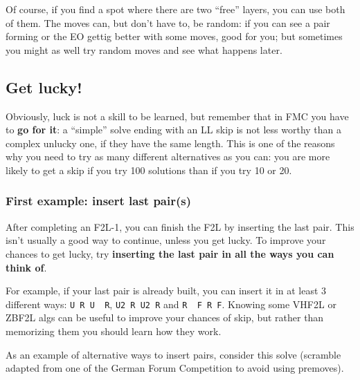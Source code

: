 \documentclass[11pt,a4paper]{book}
\newcommand{\p}{\textquotesingle}
\newcommand{\m}{\texttt}
\newcommand{\ps}{\p\,\,}
\begin{document}
Of course, if you find a spot where there are two ``free'' layers, you can use both of them. The moves can, but don't have to, be random: if you can see a pair forming or the EO gettig better with some moves, good for you; but sometimes you might as well try random moves and see what happens later.

\subsection{Get lucky!}

Obviously, luck is not a skill to be learned, but remember that in FMC you have to \textbf{go for it}: a ``simple'' solve ending with an LL skip is not less worthy than a complex unlucky one, if they have the same length. This is one of the reasons why you need to try as many different alternatives as you can: you are more likely to get a skip if you try 100 solutions than if you try 10 or 20.

\subsubsection{First example: insert last pair(s)}
\label{insert_pairs}

After completing an F2L-1, you can finish the F2L by inserting the last pair. This isn't usually a good way to continue, unless you get lucky. To improve your chances to get lucky, try \textbf{inserting the last pair in all the ways you can think of}.

For example, if your last pair is already built, you can insert it in at least 3 different ways: \m{U R U\ps R\p}, \m{U2 R U2 R\p} and \m{R\ps F R F\p}. Knowing some VHF2L or ZBF2L algs can be useful to improve your chances of skip, but rather than memorizing them you should learn how they work.

As an example of alternative ways to insert pairs, consider this solve (scramble adapted from one of the German Forum Competition to avoid using premoves).
\end{document}

